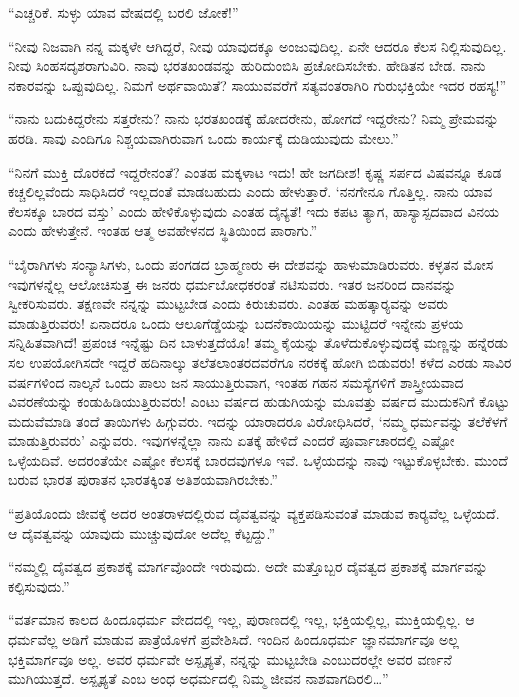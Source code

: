  “ಎಚ್ಚರಿಕೆ. ಸುಳ್ಳು ಯಾವ ವೇಷದಲ್ಲಿ ಬರಲಿ ಜೋಕೆ!” 

 “ನೀವು ನಿಜವಾಗಿ ನನ್ನ ಮಕ್ಕಳೇ ಆಗಿದ್ದರೆ, ನೀವು ಯಾವುದಕ್ಕೂ ಅಂಜುವುದಿಲ್ಲ. ಏನೇ ಆದರೂ ಕೆಲಸ ನಿಲ್ಲಿಸುವುದಿಲ್ಲ. ನೀವು ಸಿಂಹಸದೃಶರಾಗುವಿರಿ. ನಾವು ಭರತಖಂಡವನ್ನು ಹುರಿದುಂಬಿಸಿ ಪ್ರಚೋದಿಸಬೇಕು. ಹೇಡಿತನ ಬೇಡ. ನಾನು ನಕಾರವನ್ನು ಒಪ್ಪುವುದಿಲ್ಲ. ನಿಮಗೆ ಅರ್ಥವಾಯಿತೆ? ಸಾಯುವವರೆಗೆ ಸತ್ಯವಂತರಾಗಿರಿ ಗುರುಭಕ್ತಿಯೇ ಇದರ ರಹಸ್ಯ!” 

 “ನಾನು ಬದುಕಿದ್ದರೇನು ಸತ್ತರೇನು? ನಾನು ಭರತಖಂಡಕ್ಕೆ ಹೋದರೇನು, ಹೋಗದೆ ಇದ್ದರೇನು? ನಿಮ್ಮ ಪ್ರೇಮವನ್ನು ಹರಡಿ. ಸಾವು ಎಂದಿಗೂ ನಿಶ್ಚಯವಾಗಿರುವಾಗ ಒಂದು ಕಾರ್ಯಕ್ಕೆ ದುಡಿಯುವುದು ಮೇಲು.” 

 “ನಿನಗೆ ಮುಕ್ತಿ ದೊರಕದೆ ಇದ್ದರೇನಂತೆ? ಎಂತಹ ಮಕ್ಕಳಾಟ ಇದು! ಹೇ ಜಗದೀಶ! ಕೃಷ್ಣ ಸರ್ಪದ ವಿಷವನ್ನೂ ಕೂಡ ಕಚ್ಚಲಿಲ್ಲವೆಂದು ಸಾಧಿಸಿದರೆ ಇಲ್ಲದಂತೆ ಮಾಡಬಹುದು ಎಂದು ಹೇಳುತ್ತಾರೆ. ‘ನನಗೇನೂ ಗೊತ್ತಿಲ್ಲ. ನಾನು ಯಾವ ಕೆಲಸಕ್ಕೂ ಬಾರದ ವಸ್ತು’ ಎಂದು ಹೇಳಿಕೊಳ್ಳುವುದು ಎಂತಹ ದೈನ್ಯತೆ! ಇದು ಕಪಟ ತ್ಯಾಗ, ಹಾಸ್ಯಾಸ್ಪದವಾದ ವಿನಯ ಎಂದು ಹೇಳುತ್ತೇನೆ. ಇಂತಹ ಆತ್ಮ ಅವಹೇಳನದ ಸ್ಥಿತಿಯಿಂದ ಪಾರಾಗು.” 

 “ಬೈರಾಗಿಗಳು ಸಂನ್ಯಾಸಿಗಳು, ಒಂದು ಪಂಗಡದ ಬ್ರಾಹ್ಮಣರು ಈ ದೇಶವನ್ನು ಹಾಳುಮಾಡಿರುವರು. ಕಳ್ಳತನ ಮೋಸ ಇವುಗಳನ್ನೆಲ್ಲ ಆಲೋಚಿಸುತ್ತ ಈ ಜನರು ಧರ್ಮಬೋಧಕರಂತೆ ನಟಿಸುವರು. ಇತರ ಜನರಿಂದ ದಾನವನ್ನು ಸ್ವೀಕರಿಸುವರು. ತಕ್ಷಣವೇ ನನ್ನನ್ನು ಮುಟ್ಟಬೇಡ ಎಂದು ಕಿರುಚುವರು. ಎಂತಹ ಮಹತ್ಕಾರ‍್ಯವನ್ನು ಅವರು ಮಾಡುತ್ತಿರುವರು! ಏನಾದರೂ ಒಂದು ಆಲೂಗೆಡ್ಡೆಯನ್ನು ಬದನೆಕಾಯಿಯನ್ನು ಮುಟ್ಟಿದರೆ ಇನ್ನೇನು ಪ್ರಳಯ ಸನ್ನಿಹಿತವಾಗಿದೆ! ಪ್ರಪಂಚ ಇನ್ನೆಷ್ಟು ದಿನ ಬಾಳುತ್ತದೆಯೊ! ತಮ್ಮ ಕೈಯನ್ನು ತೊಳೆದುಕೊಳ್ಳುವುದಕ್ಕೆ ಮಣ್ಣನ್ನು ಹನ್ನೆರಡು ಸಲ ಉಪಯೋಗಿಸದೇ ಇದ್ದರೆ ಹದಿನಾಲ್ಕು ತಲೆತಲಾಂತರದವರೆಗೂ ನರಕಕ್ಕೆ ಹೋಗಿ ಬಿಡುವರು! ಕಳೆದ ಎರಡು ಸಾವಿರ ವರ್ಷಗಳಿಂದ ನಾಲ್ಕನೆ ಒಂದು ಪಾಲು ಜನ ಸಾಯುತ್ತಿರುವಾಗ, ಇಂತಹ ಗಹನ ಸಮಸ್ಯೆಗಳಿಗೆ ಶಾಸ್ತ್ರೀಯವಾದ ವಿವರಣೆಯನ್ನು ಕಂಡುಹಿಡಿಯುತ್ತಿರುವರು! ಎಂಟು ವರ್ಷದ ಹುಡುಗಿಯನ್ನು ಮೂವತ್ತು ವರ್ಷದ ಮುದುಕನಿಗೆ ಕೊಟ್ಟು ಮದುವೆಮಾಡಿ ತಂದೆ ತಾಯಿಗಳು ಹಿಗ್ಗುವರು. ಇದನ್ನು ಯಾರಾದರೂ ವಿರೋಧಿಸಿದರೆ, ‘ನಮ್ಮ ಧರ್ಮವನ್ನು ತಲೆಕೆಳಗೆ ಮಾಡುತ್ತಿರುವರು’ ಎನ್ನುವರು. ಇವುಗಳನ್ನೆಲ್ಲಾ ನಾನು ಏತಕ್ಕೆ ಹೇಳಿದೆ ಎಂದರೆ ಪೂರ್ವಾಚಾರದಲ್ಲಿ ಎಷ್ಟೋ ಒಳ್ಳೆಯದಿವೆ. ಅದರಂತೆಯೇ ಎಷ್ಟೋ ಕೆಲಸಕ್ಕೆ ಬಾರದವುಗಳೂ ಇವೆ. ಒಳ್ಳೆಯದನ್ನು ನಾವು ಇಟ್ಟುಕೊಳ್ಳಬೇಕು. ಮುಂದೆ ಬರುವ ಭಾರತ ಪುರಾತನ ಭಾರತಕ್ಕಿಂತ ಅತಿಶಯವಾಗಿರಬೇಕು.” 

 “ಪ್ರತಿಯೊಂದು ಜೀವಕ್ಕೆ ಅದರ ಅಂತರಾಳದಲ್ಲಿರುವ ದೈವತ್ವವನ್ನು ವ್ಯಕ್ತಪಡಿಸುವಂತೆ ಮಾಡುವ ಕಾರ‍್ಯವೆಲ್ಲ ಒಳ್ಳೆಯದೆ. ಆ ದೈವತ್ವವನ್ನು ಯಾವುದು ಮುಚ್ಚುವುದೋ ಅದೆಲ್ಲ ಕೆಟ್ಟದ್ದು.” 

 “ನಮ್ಮಲ್ಲಿ ದೈವತ್ವದ ಪ್ರಕಾಶಕ್ಕೆ ಮಾರ್ಗವೊಂದೇ ಇರುವುದು. ಅದೇ ಮತ್ತೊಬ್ಬರ ದೈವತ್ವದ ಪ್ರಕಾಶಕ್ಕೆ ಮಾರ್ಗವನ್ನು ಕಲ್ಪಿಸುವುದು.” 

 “ವರ್ತಮಾನ ಕಾಲದ ಹಿಂದೂಧರ್ಮ ವೇದದಲ್ಲಿ ಇಲ್ಲ, ಪುರಾಣದಲ್ಲಿ ಇಲ್ಲ, ಭಕ್ತಿಯಲ್ಲಿಲ್ಲ, ಮುಕ್ತಿಯಲ್ಲಿಲ್ಲ. ಆ ಧರ್ಮವೆಲ್ಲ ಅಡಿಗೆ ಮಾಡುವ ಪಾತ್ರೆಯೊಳಗೆ ಪ್ರವೇಶಿಸಿದೆ. ಇಂದಿನ ಹಿಂದೂಧರ್ಮ ಜ್ಞಾನಮಾರ್ಗವೂ ಅಲ್ಲ ಭಕ್ತಿಮಾರ್ಗವೂ ಅಲ್ಲ. ಅವರ ಧರ್ಮವೇ ಅಸ್ಪೃಶ್ಯತೆ, ನನ್ನನ್ನು ಮುಟ್ಟಬೇಡಿ ಎಂಬುದರಲ್ಲೇ ಅವರ ವರ್ಣನೆ ಮುಗಿಯುತ್ತದೆ. ಅಸ್ಪೃಶ್ಯತೆ ಎಂಬ ಅಂಧ ಅಧರ್ಮದಲ್ಲಿ ನಿಮ್ಮ ಜೀವನ ನಾಶವಾಗದಿರಲಿ…” 

